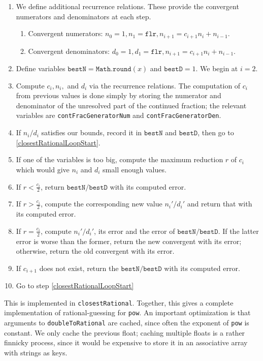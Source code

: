 \documentclass{article}
\begin{document}
\begin{enumerate}[label=(\alph*)]
  \item We define additional recurrence relations. These provide the convergent numerators and denominators at each step. \begin{enumerate}
    \item Convergent numerators: $n_0 = 1, n_1 = \texttt{flr}, n_{i+1} = c_{i+1}n_i + n_{i-1}$.
    \item Convergent denominators: $d_0 = 1, d_1 = \texttt{flr}, n_{i+1} = c_{i+1}n_i + n_{i-1}$.
\end{enumerate}
  \item Define variables $\texttt{bestN}=\texttt{Math.round}(x)$ and $\texttt{bestD}=1$. We begin at $i=2$.
  \item Compute $c_i, n_i,$ and $d_i$ via the recurrence relations. The computation of $c_i$ from previous values is done simply by storing the numerator and denominator of the unresolved part of the continued fraction; the relevant variables are \texttt{contFracGeneratorNum} and \texttt{contFracGeneratorDen}. \label{closestRationalLoopStart}
  \item If $n_i/d_i$ satisfies our bounds, record it in $\texttt{bestN}$ and $\texttt{bestD}$, then go to \ref{closestRationalLoopStart}.
  \item If one of the variables is too big, compute the maximum reduction $r$ of $c_i$ which would give $n_i$ and $d_i$ small enough values.
  \item If $r < \frac{c_i}{2}$, return $\texttt{bestN}/\texttt{bestD}$ with its computed error.
  \item If $r > \frac{c_i}{2}$, compute the corresponding new value $n_i'/d_i'$ and return that with its computed error.
  \item If $r = \frac{c_i}{2}$, compute $n_i'/d_i'$, its error and the error of $\texttt{bestN}/\texttt{bestD}$. If the latter error is worse than the former, return the new convergent with its error; otherwise, return the old convergent with its error.
  \item If $c_{i+1}$ does not exist, return the $\texttt{bestN}/\texttt{bestD}$ with its computed error.
  \item Go to step \ref{closestRationalLoopStart}
\end{enumerate}

This is implemented in \texttt{closestRational}. Together, this gives a complete implementation of rational-guessing for \texttt{pow}. An important optimization is that arguments to \texttt{doubleToRational} are cached, since often the exponent of \texttt{pow} is constant. We only cache the previous float; caching multiple floats is a rather finnicky process, since it would be expensive to store it in an associative array with strings as keys.
\end{document}
